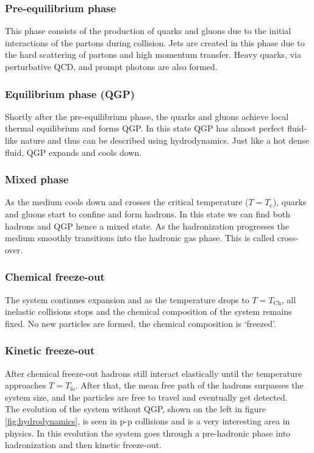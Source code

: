 \documentclass[12pt,a4paper,twoside]{report}
\begin{document}
\subsubsection{Pre-equilibrium phase}
This phase consists of the production of quarks and gluons due to the initial interactions of the partons during collision. Jets are created in this phase due to the hard scattering of partons and high momentum transfer. Heavy quarks, via perturbative QCD, and prompt photons are also formed.
\subsubsection{Equilibrium phase (QGP)}
Shortly after the pre-equilibrium phase, the quarks and gluons achieve local thermal equilibrium and forms QGP. In this state QGP has almost perfect fluid-like nature and thus can be described using hydrodynamics. Just like a hot dense fluid, QGP expands and cools down.
\subsubsection{Mixed phase}
As the medium cools down and crosses the critical temperature  ($T=T_\mathrm{c}$), quarks and gluons start to confine and form hadrons. In this state we can find both hadrons and QGP hence a mixed state. As the hadronization progresses the medium smoothly transitions into the hadronic gas phase. This is called cross-over.
\subsubsection{Chemical freeze-out}
The system continues expansion and as the temperature drops to $T=T_\mathrm{Ch}$, all inelastic collisions stops and the chemical composition of the system remains fixed. No new particles are formed, the chemical composition is `freezed'.
\subsubsection{Kinetic freeze-out}
After chemical freeze-out hadrons still interact elastically until the temperature approaches $T=T_\mathrm{fo}$. After that, the mean free path of the hadrons surpasses the system size, and the particles are free to travel and eventually get detected.\\

The evolution of the system without QGP, shown on the left in figure \ref{fig:hydrodynamics}, is seen in p-p collisions and is a very interesting area in physics. In this evolution the system goes through a pre-hadronic phase into hadronization and then kinetic freeze-out.
\end{document}
